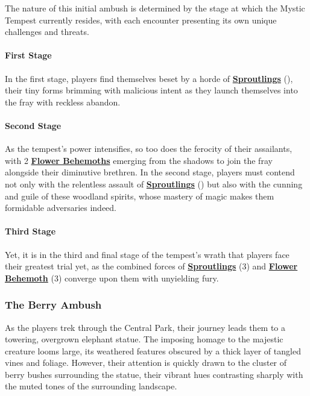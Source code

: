 The nature of this initial ambush is determined by the stage at which the Mystic Tempest currently resides, with each encounter presenting its own unique challenges and threats.\\

\paragraph*{First Stage}
In the first stage, players find themselves beset by a horde of \hyperref[sec:Sproutling]{\textbf{Sproutlings}} (), their tiny forms brimming with malicious intent as they launch themselves into the fray with reckless abandon.

\paragraph*{Second Stage}
As the tempest's power intensifies, so too does the ferocity of their assailants, with 2 \hyperref[sec:FlowerBehemoth]{\textbf{Flower Behemoths}} emerging from the shadows to join the fray alongside their diminutive brethren. In the second stage, players must contend not only with the relentless assault of \hyperref[sec:Sproutling]{\textbf{Sproutlings}} () but also with the cunning and guile of these woodland spirits, whose mastery of magic makes them formidable adversaries indeed.

\paragraph*{Third Stage}
Yet, it is in the third and final stage of the tempest's wrath that players face their greatest trial yet, as the combined forces of \hyperref[sec:Sproutling]{\textbf{Sproutlings}} (3) and \hyperref[sec:FlowerBehemoth]{\textbf{Flower Behemoth}} (3) converge upon them with unyielding fury.

\subsubsection*{The Berry Ambush}
As the players trek through the Central Park, their journey leads them to a towering, overgrown elephant statue. The imposing homage to the majestic creature looms large, its weathered features obscured by a thick layer of tangled vines and foliage. However, their attention is quickly drawn to the cluster of berry bushes surrounding the statue, their vibrant hues contrasting sharply with the muted tones of the surrounding landscape.

